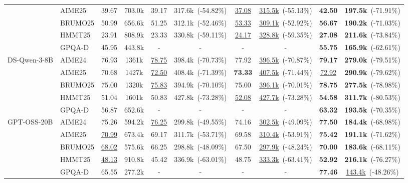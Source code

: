 \documentclass[11pt]{article}
\theoremstyle{plain}
\begin{document}
\begin{table}[t]
{\begin{tabular}{llcc cc cc cc}
& AIME25 & 39.67 & 703.0k & 39.17 & 317.6k~(-54.82\%) & \underline{37.08} & \underline{315.5k}~(-55.13\%) & \textbf{42.50} & \textbf{197.5k}~(-71.91\%) \\
& BRUMO25 & 50.99 & 656.6k & 51.25 & 312.1k~(-52.46\%) & \underline{53.33} & \underline{309.1k}~(-52.92\%) & \textbf{56.67} & \textbf{190.2k}~(-71.03\%)\\
& HMMT25 & 23.91 & 808.9k & 23.33 & 330.8k~(-59.11\%) & \underline{24.17} & \underline{328.8k}~(-59.35\%) & \textbf{27.08} & \textbf{211.6k}~(-73.84\%)\\
& GPQA-D & 45.95 & 443.8k & - & - & - & - & \textbf{55.75} & \textbf{165.9k}~(-62.61\%)\\
\midrule
\multirow{5}{*}{DS-Qwen-3-8B} 
& AIME24 & 76.93 & 1361k & \underline{78.75} & 398.4k~(-70.73\%) & 77.92 & \underline{396.5k}~(-70.87\%) & \textbf{79.17} & \textbf{279.0k}~(-79.51\%)\\
& AIME25 & 70.68 & 1427k & \underline{72.50} & 408.4k~(-71.39\%) & \textbf{73.33} & \underline{407.5k}~(-71.44\%) & \underline{72.92} & \textbf{290.9k}~(-79.62\%)\\
& BRUMO25 & 75.00 & 1320k & \underline{75.83} & 394.9k~(-70.10\%) & 75.00 & \underline{396.1k}~(-70.01\%) & \textbf{78.75} & \textbf{277.5k}~(-78.98\%)\\
& HMMT25 & 51.04 & 1601k & 50.83 & 427.8k~(-73.28\%) & \underline{52.08} & \underline{427.7k}~(-73.28\%) & \textbf{54.58} & \textbf{311.7k}~(-80.53\%)\\
& GPQA-D & 56.87 & 652.6k & - & - & - & - & \textbf{63.32} & \textbf{193.5k}~(-70.35\%)\\
\midrule
\multirow{5}{*}{GPT-OSS-20B}
& AIME24 & 75.26 & 594.2k & \underline{76.25} & 299.8k~(-49.55\%) & 74.16 & \underline{302.5k}~(-49.09\%) & \textbf{77.50} & \textbf{184.4k}~(-68.98\%) \\
& AIME25 & \underline{70.99} & 673.4k & 69.17 & 311.7k~(-53.71\%) & 69.58 & \underline{310.4k}~(-53.91\%) & \textbf{75.42} & \textbf{191.1k}~(-71.62\%)\\
& BRUMO25 & \underline{68.02} & 575.6k & 66.25 & 298.8k~(-48.09\%) & 67.50 & \underline{297.9k}~(-48.24\%) & \textbf{70.00} & \textbf{183.6k}~(-68.11\%) \\
& HMMT25 & \underline{48.13} & 910.8k & 45.42 & 336.9k~(-63.01\%) & 48.75 & \underline{333.3k}~(-63.41\%) & \textbf{52.92} & \textbf{216.1k}~(-76.27\%)\\
& GPQA-D & 65.55 & 277.2k & - & - & - & - & \textbf{77.46} & \underline{143.4k}~(-48.26\%)\\
\bottomrule
\end{tabular}
}
\end{table}
\end{document}
